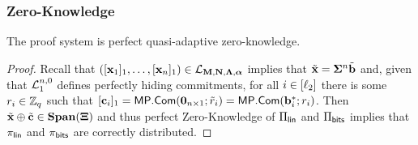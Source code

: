 \subsubsection{Zero-Knowledge}

\begin{theorem}
The proof system is perfect quasi-adaptive zero-knowledge.
\end{theorem}

\begin{proof}
Recall that $([\mathbf{x}_1]_1,\ldots,[\mathbf{x}_n]_1)\in\mathcal{L}_{\mathbf{{M}},\mathbf{{N}},\mathbf{{\Lambda}},{\boldsymbol \alpha}}$ implies that
$
{\tilde{\mathbf{x}}}
=\mathbf{{\Sigma}}^n{\tilde{\mathbf{b}}}
$
and, given that $\mathcal{L}_1^{n,0}$ defines perfectly hiding commitments, for all $i\in[{\ell_2}]$ there is some $r_i\in\mathbb{Z}_q$ such that
$[\mathbf{c}_i]_1=\mathsf{MP}.\mathsf{Com}(\mathbf{{0}}_{n\times1};\tilde{{r}}_i)=\mathsf{MP}.\mathsf{Com}(\mathbf{b}_i^*;r_i)$. Then ${\tilde{\mathbf{x}}}\oplus{\tilde{\mathbf{c}}}\in\mathbf{Span}(\mathbf{{\Xi}})$ and thus perfect Zero-Knowledge of $\Pi_{\mathsf{lin}}$ and $\Pi_{\mathsf{bits}}$ implies that $\pi_{\mathsf{lin}}$ and $\pi_{\mathsf{bits}}$ are correctly distributed.
\end{proof}
